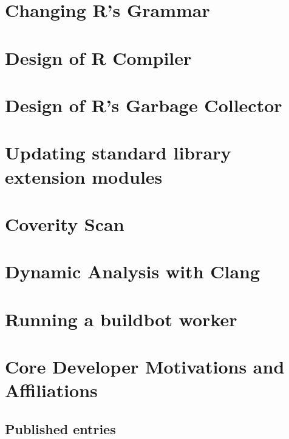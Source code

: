 \documentclass[]{book}
\begin{document}
\hypertarget{changing-rs-grammar}{%
\chapter{Changing R's Grammar}\label{changing-rs-grammar}}

\hypertarget{design-of-r-compiler}{%
\chapter{Design of R Compiler}\label{design-of-r-compiler}}

\hypertarget{design-of-rs-garbage-collector}{%
\chapter{Design of R's Garbage Collector}\label{design-of-rs-garbage-collector}}

\hypertarget{updating-standard-library-extension-modules}{%
\chapter{Updating standard library extension modules}\label{updating-standard-library-extension-modules}}

\hypertarget{coverity-scan}{%
\chapter{Coverity Scan}\label{coverity-scan}}

\hypertarget{dynamic-analysis-with-clang}{%
\chapter{Dynamic Analysis with Clang}\label{dynamic-analysis-with-clang}}

\hypertarget{running-a-buildbot-worker}{%
\chapter{Running a buildbot worker}\label{running-a-buildbot-worker}}

\hypertarget{core-developer-motivations-and-affiliations}{%
\chapter{Core Developer Motivations and Affiliations}\label{core-developer-motivations-and-affiliations}}

\hypertarget{published-entries}{%
\section{Published entries}\label{published-entries}}
\end{document}
